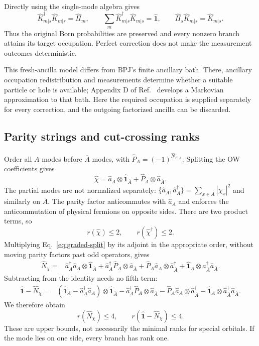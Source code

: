 \documentclass[aps,prb,onecolumn,nofootinbib,superscriptaddress]{revtex4-2}
\newcommand{\One}{\hat{\mathbf{1}}}
\newcommand{\Abar}{\overline A}
\begin{document}
Directly using the single-mode algebra gives
\begin{equation}
 \hat K_{m|s}^\dagger\hat K_{m|s}=\hat\Pi_m,\qquad
 \sum_m\hat K_{m|s}^\dagger\hat K_{m|s}=\One,\qquad
 \hat\Pi_s\hat K_{m|s}=\hat K_{m|s}.
 \label{eq:kraus-checks}
\end{equation}
Thus the original Born probabilities are preserved and every nonzero
branch attains its target occupation. Perfect correction does not make the
measurement outcomes deterministic.

This fresh-ancilla model differs from BPJ's finite ancillary bath. There,
ancillary occupation redistribution and measurements determine whether a
suitable particle or hole is available; Appendix D of
Ref.~\cite{BhuiyanPanJian2026} develops a Markovian approximation to that
bath. Here the required occupation is supplied separately for every
correction, and the outgoing factorized ancilla can be discarded.

\subsection{Parity strings and cut-crossing ranks}
Order all $A$ modes before $\Abar$ modes, with
$\hat P_A=(-1)^{\hat N_{F,A}}$. Splitting the OW coefficients gives
\begin{equation}
 \hat\chi=\hat a_A\otimes\One_{\Abar}
       +\hat P_A\otimes\hat a_{\Abar}.
 \label{eq:graded-split}
\end{equation}
The partial modes are not normalized separately:
$\{\hat a_A,\hat a_A^\dagger\}=\sum_{x\in A}|\chi_x|^2$ and similarly
on $\Abar$. The parity factor anticommutes with $\hat a_A$ and enforces
the anticommutation of physical fermions on opposite sides.
There are two product terms, so
\begin{equation}
 r(\hat\chi)\leq2,\qquad r(\hat\chi^\dagger)\leq2 .
 \label{eq:odd-ranks}
\end{equation}
Multiplying Eq.~\eqref{eq:graded-split} by its adjoint in the appropriate
order, without moving parity factors past odd operators, gives
\begin{align}
 \hat N_\chi={}&
 \hat a_A^\dagger\hat a_A\otimes\One_{\Abar}
 +\hat a_A^\dagger\hat P_A\otimes\hat a_{\Abar}
 +\hat P_A\hat a_A\otimes\hat a_{\Abar}^\dagger
 +\One_A\otimes\hat a_{\Abar}^\dagger\hat a_{\Abar}.
 \label{eq:number-split}
\end{align}
Subtracting from the identity needs no fifth term:
\begin{align}
 \One-\hat N_\chi={}&
 (\One_A-\hat a_A^\dagger\hat a_A)\otimes\One_{\Abar}
 -\hat a_A^\dagger\hat P_A\otimes\hat a_{\Abar}
 -\hat P_A\hat a_A\otimes\hat a_{\Abar}^\dagger
 -\One_A\otimes\hat a_{\Abar}^\dagger\hat a_{\Abar}.
\end{align}
We therefore obtain
\begin{equation}
 r(\hat N_\chi)\leq4,\qquad r(\One-\hat N_\chi)\leq4 .
 \label{eq:even-ranks}
\end{equation}
These are upper bounds, not necessarily the minimal ranks for special
orbitals. If the mode lies on one side, every branch has rank one.
\end{document}
